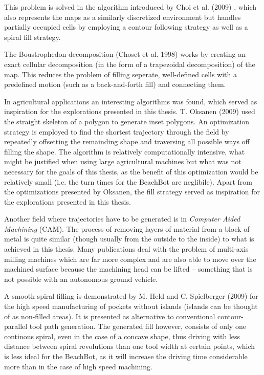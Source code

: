 This problem is solved in the algorithm introduced by Choi et al. (2009) \cite{choi2009online}, which also represents the maps as a similarly discretized environment but handles partially occupied cells by employing a contour following strategy as well as a spiral fill strategy.

The Boustrophedon decomposition (Choset et al. 1998) \cite{choset1998coverage} works by creating an exact cellular decomposition (in the form of a trapezoidal decomposition) of the map. This reduces the problem of filling seperate, well-defined cells with a predefined motion (such as a back-and-forth fill) and connecting them.

In agricultural applications an interesting algorithms  was found, which served as inspiration for the explorations presented in this thesis. T. Oksanen (2009) \citep{ROB:ROB20300} used the straight skeleton of a polygon to generate inset polygons. An optimization strategy is employed to find the shortest trajectory through the field by repeatedly offsetting the remainding shape and traversing all possible ways off filling the shape. The algorithm is relatively computationally intensive, what might be justified when using large agricultural machines but what was not necessary for the goals of this thesis, as the benefit of this optimization would be relatively small (i.e. the turn times for the BeachBot are neglibile). Apart from the optimizations presented by Oksanen, the fill strategy served as inspiration for the explorations presented in this thesis. 

Another field where trajectories have to be generated is in \textit{Computer Aided Machining} (CAM). The process of removing layers of material from a block of metal is quite similar (though usually from the outside to the inside) to what is achieved in this thesis. Many publications deal with the problem of multi-axis milling machines which are far more complex and are also able to move over the machined surface because the machining head can be lifted -- something that is not possible with an autonomous ground vehicle.

A smooth spiral filling is demonstrated by M. Held and C. Spielberger (2009) \cite{held2009smooth} for the high speed manufacturing of pockets without islands (islands can be thought of as non-filled areas). It is presented as alternative to conventional contour-parallel tool path generation. The generated fill however, consists of only one continous spiral, even in the case of a concave shape, thus driving with less distance between spiral revolutions than one tool width at certain points, which is less ideal for the BeachBot, as it will increase the driving time considerable more than in the case of high speed machining.

